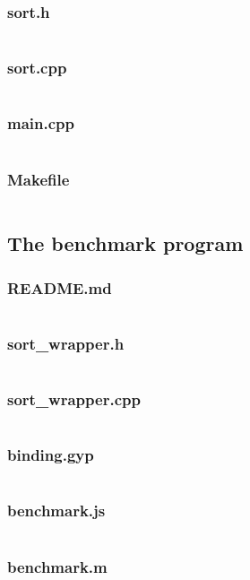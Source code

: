 \documentclass{article}
\begin{document}
\subsubsection{sort.h}
\inputminted{c++}{../answer/sort.h}
\subsubsection{sort.cpp}
\inputminted{c++}{../answer/sort.cpp}
\subsubsection{main.cpp}
\inputminted{c++}{../answer/main.cpp}
\subsubsection{Makefile}
\inputminted{makefile}{../answer/Makefile}


\subsection{The benchmark program}
\subsubsection{README.md}
\inputminted{md}{../benchmark/README.md}
\subsubsection{sort\_wrapper.h}
\inputminted{c++}{../benchmark/sort_wrapper.h}
\subsubsection{sort\_wrapper.cpp}
\inputminted{c++}{../benchmark/sort_wrapper.cpp}
\subsubsection{binding.gyp}
\inputminted{json}{../benchmark/binding.gyp}
\subsubsection{benchmark.js}
\inputminted{javascript}{../benchmark/benchmark.js}
\subsubsection{benchmark.m}
\inputminted{matlab}{../benchmark/benchmark.m}
\end{document}
